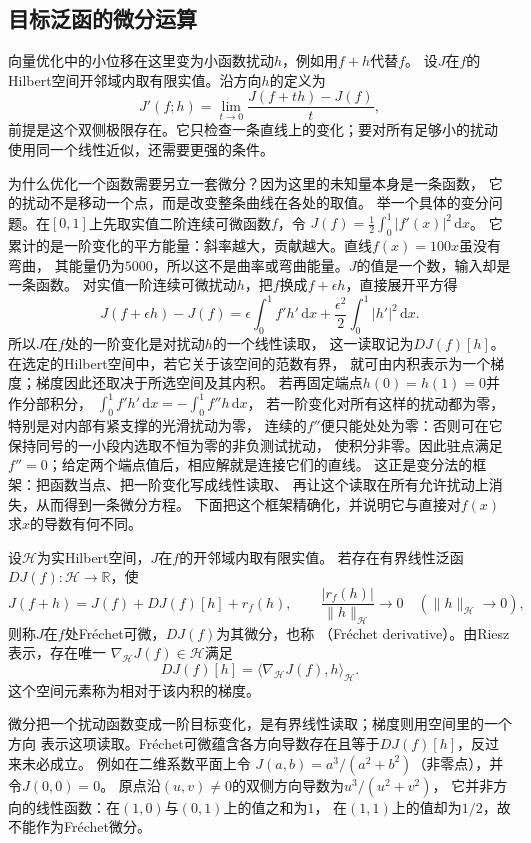 \subsection{目标泛函的微分运算}
\label{sec:functional-objective-differentiation}

向量优化中的小位移在这里变为小函数扰动$h$，例如用$f+h$代替$f$。
设$J$在$f$的Hilbert空间开邻域内取有限实值。沿方向$h$的定义为
\[
 J'(f;h)=\lim_{t\to0}\frac{J(f+th)-J(f)}{t},
\]
前提是这个双侧极限存在。它只检查一条直线上的变化；要对所有足够小的扰动
使用同一个线性近似，还需要更强的条件。

为什么优化一个函数需要另立一套微分？因为这里的未知量本身是一条函数，
它的扰动不是移动一个点，而是改变整条曲线在各处的取值。
举一个具体的变分问题。在$[0,1]$上先取实值二阶连续可微函数$f$，令
$J(f)=\frac12\int_0^1|f'(x)|^2\,\mathrm dx$。
它累计的是一阶变化的平方能量：斜率越大，贡献越大。直线$f(x)=100x$虽没有弯曲，
其能量仍为$5000$，所以这不是曲率或弯曲能量。$J$的值是一个数，输入却是一条函数。
对实值一阶连续可微扰动$h$，把$f$换成$f+\epsilon h$，直接展开平方得
\[
 J(f+\epsilon h)-J(f)=\epsilon\int_0^1 f'h'\,\mathrm dx
                  +\frac{\epsilon^2}{2}\int_0^1|h'|^2\,\mathrm dx.
\]
所以$J$在$f$处的一阶变化是对扰动$h$的一个线性读取，
这一读取记为$DJ(f)[h]$。在选定的Hilbert空间中，若它关于该空间的范数有界，
就可由内积表示为一个梯度；梯度因此还取决于所选空间及其内积。
若再固定端点$h(0)=h(1)=0$并作分部积分，
$\int_0^1f'h'\,\mathrm dx=-\int_0^1f''h\,\mathrm dx$，
若一阶变化对所有这样的扰动都为零，特别是对内部有紧支撑的光滑扰动为零，
连续的$f''$便只能处处为零：否则可在它保持同号的一小段内选取不恒为零的非负测试扰动，
使积分非零。因此驻点满足$f''=0$；给定两个端点值后，相应解就是连接它们的直线。
这正是变分法的框架：把函数当点、把一阶变化写成线性读取、
再让这个读取在所有允许扰动上消失，从而得到一条微分方程。
下面把这个框架精确化，并说明它与直接对$f(x)$求$x$的导数有何不同。

\begin{definition}[函数泛函的Fréchet微分与梯度]
\label{def:functional-frechet-gradient}
设$\mathcal H$为实Hilbert空间，$J$在$f$的开邻域内取有限实值。
若存在有界线性泛函$DJ(f):\mathcal H\to\mathbb R$，使
\[
 J(f+h)=J(f)+DJ(f)[h]+r_f(h),\qquad
 \frac{|r_f(h)|}{\lVert h\rVert_{\mathcal H}}\longrightarrow0
 \quad(\lVert h\rVert_{\mathcal H}\to0),
\]
则称$J$在$f$处Fréchet可微，$DJ(f)$为其微分，也称
（Fréchet derivative）。由Riesz表示，存在唯一
$\nabla_{\mathcal H}J(f)\in\mathcal H$满足
\[
 DJ(f)[h]=\langle\nabla_{\mathcal H}J(f),h\rangle_{\mathcal H}.
\]
这个空间元素称为相对于该内积的梯度。
\end{definition}
微分把一个扰动函数变成一阶目标变化，是有界线性读取；梯度则用空间里的一个方向
表示这项读取。Fréchet可微蕴含各方向导数存在且等于$DJ(f)[h]$，反过来未必成立。
例如在二维系数平面上令
$J(a,b)=a^3/(a^2+b^2)$（非零点），并令$J(0,0)=0$。
原点沿$(u,v)\neq0$的双侧方向导数为$u^3/(u^2+v^2)$，
它并非方向的线性函数：在$(1,0)$与$(0,1)$上的值之和为$1$，
在$(1,1)$上的值却为$1/2$，故不能作为Fréchet微分。

